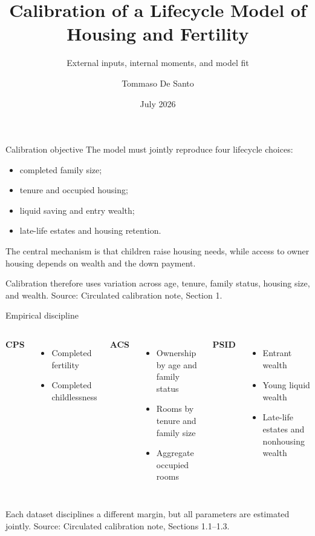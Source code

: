 \documentclass[aspectratio=169,11pt]{beamer}
\title{Calibration of a Lifecycle Model of Housing and Fertility}
\subtitle{External inputs, internal moments, and model fit}
\author{Tommaso De Santo}
\date{July 2026}
\newcommand{\source}[1]{\vfill{\color{Muted}\tiny Source: #1}}
\newcommand{\tightitems}{\setlength{\itemsep}{0.55em}}
\begin{document}
\begin{frame}[plain]
  \titlepage
\end{frame}

\begin{frame}{Calibration objective}
  \large
  The model must jointly reproduce four lifecycle choices:
  \begin{itemize}\tightitems
    \item completed family size;
    \item tenure and occupied housing;
    \item liquid saving and entry wealth;
    \item late-life estates and housing retention.
  \end{itemize}

  \vspace{0.5em}
  The central mechanism is that children raise housing needs, while access to owner housing depends on wealth and the down payment.

  \vspace{0.5em}
  Calibration therefore uses variation across age, tenure, family status, housing size, and wealth.
  \source{Circulated calibration note, Section 1.}
\end{frame}

\begin{frame}{Empirical discipline}
  \begin{columns}[T,onlytextwidth]
      \large\textbf{CPS}
      \begin{itemize}\tightitems
        \item Completed fertility
        \item Completed childlessness
      \end{itemize}
      \large\textbf{ACS}
      \begin{itemize}\tightitems
        \item Ownership by age and family status
        \item Rooms by tenure and family size
        \item Aggregate occupied rooms
      \end{itemize}
      \large\textbf{PSID}
      \begin{itemize}\tightitems
        \item Entrant wealth
        \item Young liquid wealth
        \item Late-life estates and nonhousing wealth
      \end{itemize}
  \end{columns}

  \vspace{1.0em}
  Each dataset disciplines a different margin, but all parameters are estimated jointly.
  \source{Circulated calibration note, Sections 1.1--1.3.}
\end{frame}
\end{document}
